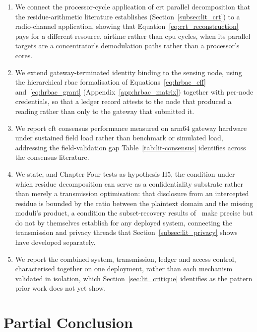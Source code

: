 \documentclass[12pt,a4paper,oneside]{book}
\begin{document}
\begin{enumerate}
  \item We connect the processor-cycle application of \gls{crt} parallel
        decomposition that the residue-arithmetic literature establishes
        (Section~\ref{subsec:lit_crt}) to a radio-channel application,
        showing that Equation~\ref{eq:crt_reconstruction} pays for a
        different resource, airtime rather than \gls{cpu} cycles, when its
        parallel targets are a concentrator's demodulation paths rather
        than a processor's cores.
  \item We extend gateway-terminated identity binding to the sensing
        node, using the hierarchical \gls{rbac} formalisation of
        Equations~\ref{eq:hrbac_eff} and~\ref{eq:hrbac_grant}
        (Appendix~\ref{app:hrbac_matrix}) together with per-node
        credentials, so that a ledger record attests to the node that
        produced a reading rather than only to the gateway that submitted
        it.
  \item We report \gls{cft} consensus performance measured on \gls{arm64}
        gateway hardware under sustained field load rather than benchmark
        or simulated load, addressing the field-validation gap
        Table~\ref{tab:lit-consensus} identifies across the consensus
        literature.
  \item We state, and Chapter Four tests as hypothesis H5, the condition
        under which residue decomposition can serve as a confidentiality
        substrate rather than merely a transmission optimisation: that
        disclosure from an intercepted residue is bounded by the ratio
        between the plaintext domain and the missing moduli's product, a
        condition the subset-recovery results
        of~\cite{goldreich1999china, shoup2009computational} make precise
        but do not by themselves establish for any deployed system,
        connecting the transmission and privacy threads that
        Section~\ref{subsec:lit_privacy} shows have developed
        separately.
  \item We report the combined system, transmission, ledger and access
        control, characterised together on one deployment, rather than
        each mechanism validated in isolation, which
        Section~\ref{sec:lit_critique} identifies as the pattern prior
        work does not yet show.
\end{enumerate}

\section{Partial Conclusion}
\label{sec:lit_partial_conclusion}
\end{document}
